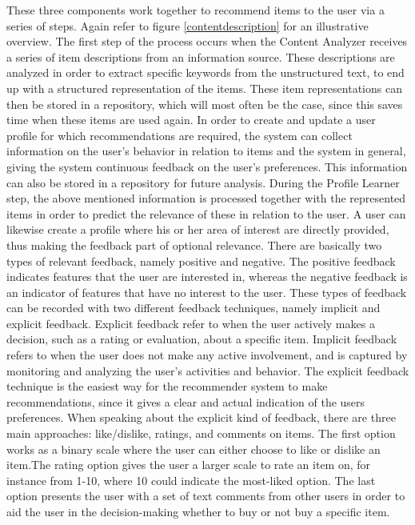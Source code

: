 These three components work together to recommend items to the user via a series of steps. Again refer to figure \ref{contentdescription} for an illustrative overview.\newline 
The first step of the process occurs when the Content Analyzer receives a series of item descriptions from an information source. These descriptions are analyzed in order to extract specific keywords from the unstructured text, to end up with a structured representation of the items. These item representations can then be stored in a repository, which will most often be the case, since this saves time when these items are used again. In order to create and update a user profile for which recommendations are required, the system can collect information on the user's behavior in relation to items and the system in general, giving the system continuous feedback on the user's preferences. This information can also be stored in a repository for future analysis.\newline
During the Profile Learner step, the above mentioned information is processed together with the represented items in order to predict the relevance of these in relation to the user. A user can likewise create a profile where his or her area of interest are directly provided, thus making the feedback part of optional relevance.\newline
There are basically two types of relevant feedback, namely positive and negative. The positive feedback indicates features that the user are interested in, whereas the negative feedback is an indicator of features that have no interest to the user. \newline
These types of feedback can be recorded with two different feedback techniques, namely implicit and explicit feedback. Explicit feedback refer to when the user actively makes a decision, such as a rating or evaluation, about a specific item. Implicit feedback refers to when the user does not make any active involvement, and is captured by monitoring and analyzing the user's activities and behavior.\newline
The explicit feedback technique is the easiest way for the recommender system to make recommendations, since it gives a clear and actual indication of the users preferences. When speaking about the explicit kind of feedback, there are three main approaches: like/dislike, ratings, and comments on items.\newline
The first option works as a binary scale where the user can either choose to like or dislike an item.The rating option gives the user a larger scale to rate an item on, for instance from 1-10, where 10 could indicate the most-liked option. The last option presents the user with a set of text comments from other users in order to aid the user in the decision-making whether to buy or not buy a specific item.\newline

